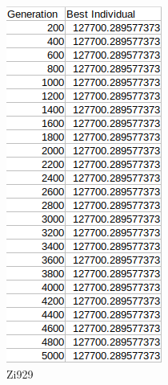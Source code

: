 \documentclass[11pt,a4paper,titlepage]{article}
\begin{document}
\begin{figure}[ht]
\begin{subfigure}{.32\textwidth}
		\includegraphics[width=.75\textwidth]{MultZi929}
		\caption{Zi929}
	\end{subfigure}	
	\begin{subfigure}{.32\textwidth}
		\centering

\end{subfigure}
\end{figure}
\end{document}
